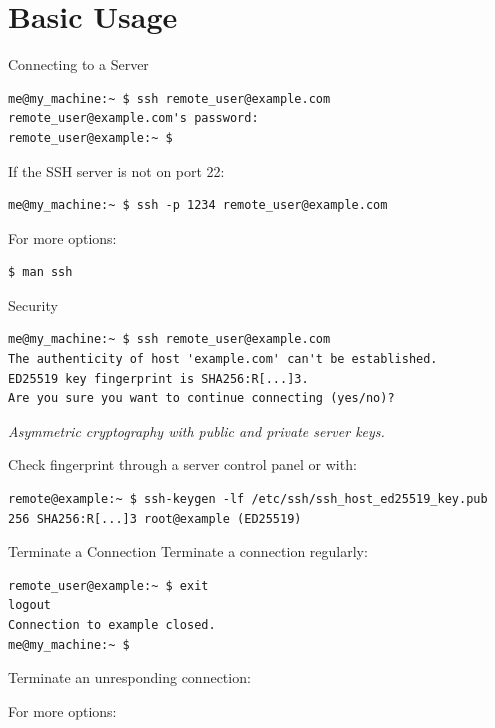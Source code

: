 \documentclass[10pt, graphics, aspectratio=169, table]{beamer}
\begin{document}
\section{Basic Usage}
\begin{frame}[fragile]{Connecting to a Server}
	\begin{lstlisting}
me@my_machine:~ $ ssh remote_user@example.com
remote_user@example.com's password:
remote_user@example:~ $
	\end{lstlisting}
	\pause

	If the SSH server is not on port 22:
	\begin{lstlisting}
me@my_machine:~ $ ssh -p 1234 remote_user@example.com
	\end{lstlisting}
	\pause

	For more options:
	\begin{lstlisting}
$ man ssh
	\end{lstlisting}
\end{frame}

\begin{frame}[fragile]{Security}
	\begin{lstlisting}
me@my_machine:~ $ ssh remote_user@example.com
The authenticity of host 'example.com' can't be established.
ED25519 key fingerprint is SHA256:R[...]3.
Are you sure you want to continue connecting (yes/no)?
	\end{lstlisting}
	\pause

	\emph{Asymmetric cryptography with public and private server keys.}
	\pause

	Check fingerprint through a server control panel or with:
	\begin{lstlisting}
remote@example:~ $ ssh-keygen -lf /etc/ssh/ssh_host_ed25519_key.pub
256 SHA256:R[...]3 root@example (ED25519)
	\end{lstlisting}
\end{frame}

\begin{frame}[fragile]{Terminate a Connection}
	Terminate a connection regularly:
	\begin{lstlisting}
remote_user@example:~ $ exit
logout
Connection to example closed.
me@my_machine:~ $
	\end{lstlisting}

	Terminate an unresponding connection: \\
	\keys{\return} \keys{$\sim$} 

	For more options: \\
	\keys{\return} \keys{$\sim$} 
\end{frame}
\end{document}
